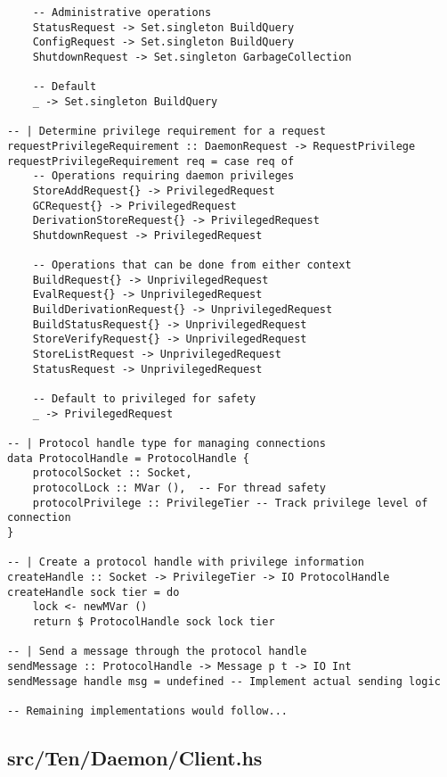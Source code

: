 \documentclass{article}
\begin{document}
\begin{tcolorbox}[title=Ten/Daemon/Protocol.hs Changes]
\begin{verbatim}
    -- Administrative operations
    StatusRequest -> Set.singleton BuildQuery
    ConfigRequest -> Set.singleton BuildQuery
    ShutdownRequest -> Set.singleton GarbageCollection

    -- Default
    _ -> Set.singleton BuildQuery

-- | Determine privilege requirement for a request
requestPrivilegeRequirement :: DaemonRequest -> RequestPrivilege
requestPrivilegeRequirement req = case req of
    -- Operations requiring daemon privileges
    StoreAddRequest{} -> PrivilegedRequest
    GCRequest{} -> PrivilegedRequest
    DerivationStoreRequest{} -> PrivilegedRequest
    ShutdownRequest -> PrivilegedRequest

    -- Operations that can be done from either context
    BuildRequest{} -> UnprivilegedRequest
    EvalRequest{} -> UnprivilegedRequest
    BuildDerivationRequest{} -> UnprivilegedRequest
    BuildStatusRequest{} -> UnprivilegedRequest
    StoreVerifyRequest{} -> UnprivilegedRequest
    StoreListRequest -> UnprivilegedRequest
    StatusRequest -> UnprivilegedRequest

    -- Default to privileged for safety
    _ -> PrivilegedRequest

-- | Protocol handle type for managing connections
data ProtocolHandle = ProtocolHandle {
    protocolSocket :: Socket,
    protocolLock :: MVar (),  -- For thread safety
    protocolPrivilege :: PrivilegeTier -- Track privilege level of connection
}

-- | Create a protocol handle with privilege information
createHandle :: Socket -> PrivilegeTier -> IO ProtocolHandle
createHandle sock tier = do
    lock <- newMVar ()
    return $ ProtocolHandle sock lock tier

-- | Send a message through the protocol handle
sendMessage :: ProtocolHandle -> Message p t -> IO Int
sendMessage handle msg = undefined -- Implement actual sending logic

-- Remaining implementations would follow...
\end{verbatim}
\end{tcolorbox}

\subsection{src/Ten/Daemon/Client.hs}
\end{document}
